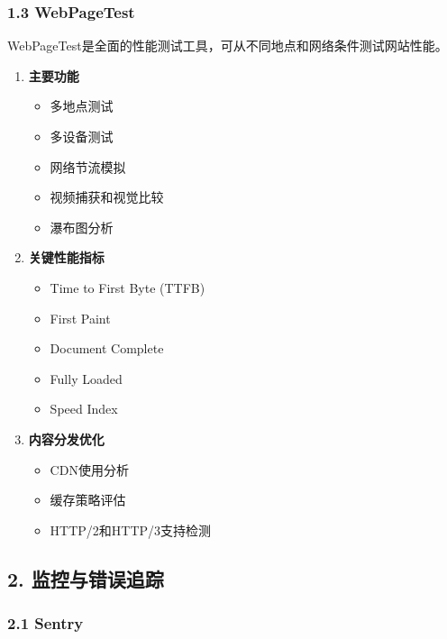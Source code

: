 \subsubsection{1.3 WebPageTest}\label{webpagetest}

WebPageTest是全面的性能测试工具，可从不同地点和网络条件测试网站性能。

\begin{enumerate}
\def\labelenumi{\arabic{enumi}.}
\tightlist
\item
  \textbf{主要功能}

  \begin{itemize}
  \tightlist
  \item
    多地点测试
  \item
    多设备测试
  \item
    网络节流模拟
  \item
    视频捕获和视觉比较
  \item
    瀑布图分析
  \end{itemize}
\item
  \textbf{关键性能指标}

  \begin{itemize}
  \tightlist
  \item
    Time to First Byte (TTFB)
  \item
    First Paint
  \item
    Document Complete
  \item
    Fully Loaded
  \item
    Speed Index
  \end{itemize}
\item
  \textbf{内容分发优化}

  \begin{itemize}
  \tightlist
  \item
    CDN使用分析
  \item
    缓存策略评估
  \item
    HTTP/2和HTTP/3支持检测
  \end{itemize}
\end{enumerate}

\subsection{2.
监控与错误追踪}\label{ux76d1ux63a7ux4e0eux9519ux8befux8ffdux8e2a}

\subsubsection{2.1 Sentry}\label{sentry}

